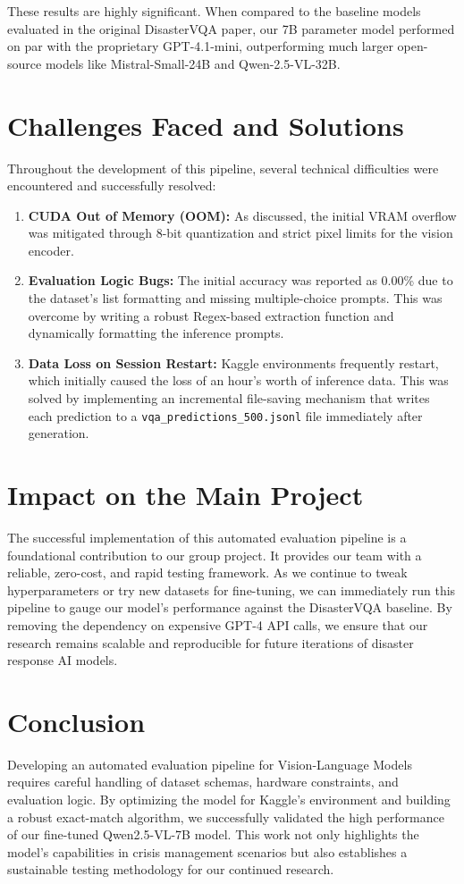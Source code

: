 \documentclass[conference]{IEEEtran}
\begin{document}
These results are highly significant. When compared to the baseline models evaluated in the original DisasterVQA paper, our 7B parameter model performed on par with the proprietary GPT-4.1-mini, outperforming much larger open-source models like Mistral-Small-24B and Qwen-2.5-VL-32B.

\section{Challenges Faced and Solutions}
Throughout the development of this pipeline, several technical difficulties were encountered and successfully resolved:
\begin{enumerate}
    \item \textbf{CUDA Out of Memory (OOM):} As discussed, the initial VRAM overflow was mitigated through 8-bit quantization and strict pixel limits for the vision encoder.
    \item \textbf{Evaluation Logic Bugs:} The initial accuracy was reported as 0.00\% due to the dataset's list formatting and missing multiple-choice prompts. This was overcome by writing a robust Regex-based extraction function and dynamically formatting the inference prompts.
    \item \textbf{Data Loss on Session Restart:} Kaggle environments frequently restart, which initially caused the loss of an hour's worth of inference data. This was solved by implementing an incremental file-saving mechanism that writes each prediction to a \texttt{vqa\_predictions\_500.jsonl} file immediately after generation.
\end{enumerate}

\section{Impact on the Main Project}
The successful implementation of this automated evaluation pipeline is a foundational contribution to our group project. It provides our team with a reliable, zero-cost, and rapid testing framework. As we continue to tweak hyperparameters or try new datasets for fine-tuning, we can immediately run this pipeline to gauge our model's performance against the DisasterVQA baseline. By removing the dependency on expensive GPT-4 API calls, we ensure that our research remains scalable and reproducible for future iterations of disaster response AI models.

\section{Conclusion}
Developing an automated evaluation pipeline for Vision-Language Models requires careful handling of dataset schemas, hardware constraints, and evaluation logic. By optimizing the model for Kaggle's environment and building a robust exact-match algorithm, we successfully validated the high performance of our fine-tuned Qwen2.5-VL-7B model. This work not only highlights the model's capabilities in crisis management scenarios but also establishes a sustainable testing methodology for our continued research.
\end{document}
